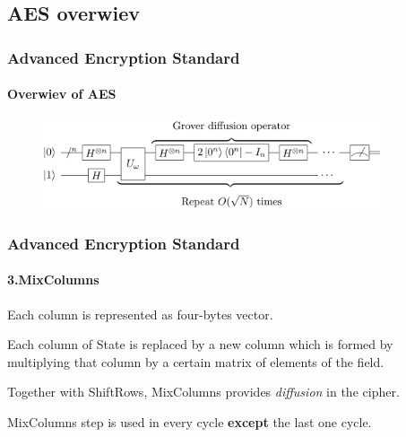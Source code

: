 \subsection{AES overwiev} 
\begin{frame}
	\frametitle{Advanced Encryption Standard}
		\framesubtitle{Overwiev of AES}
	\vspace{0.5cm}
		\begin{figure}
		\centering
		\includegraphics[width=10cm]{grdiffusion}
		\label{fig:grdiffusion grdiffusion}
	\end{figure}
\end{frame}
\begin{frame}
	\frametitle{Advanced Encryption Standard}
		\framesubtitle{3.MixColumns}
		\vfill
	
	\begin{block}{}
    	{Each column is represented as four-bytes vector.}\\
    \end{block}
    \begin{block}{}
		{Each column of State is replaced by a new column which is formed by multiplying that column by a certain 			matrix of elements of the field.}\\	
	\end{block}	
	    \begin{block}{}
		{Together with ShiftRows, MixColumns provides \textit{diffusion} in the cipher.}\\	
	\end{block}
		\begin{alertblock}{}
		{MixColumns step is used in every cycle \textbf{except} the last one cycle.}\\
		\end{alertblock}
\end{frame}

